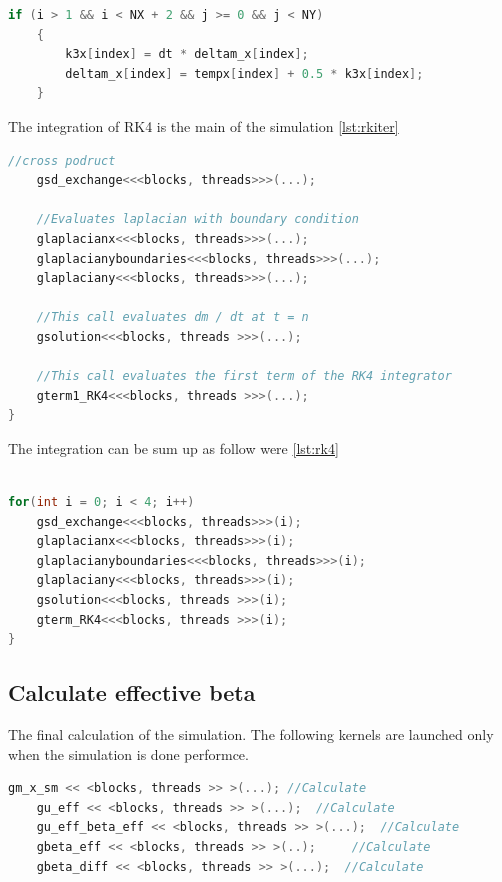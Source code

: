 \begin{lstlisting}[language=C++, label={lst:rkcuda}, caption={CPU Vector Addition}]
    if (i > 1 && i < NX + 2 && j >= 0 && j < NY)
    {
        k3x[index] = dt * deltam_x[index];
        deltam_x[index] = tempx[index] + 0.5 * k3x[index];   
    }
\end{lstlisting}

The integration of RK4 is the main of the simulation \ref{lst:rkiter}

\begin{lstlisting}[language=C++, label={lst:rkiter}, caption={Runge y Kutta integration}]
	//cross podruct
    gsd_exchange<<<blocks, threads>>>(...);

	//Evaluates laplacian with boundary condition
    glaplacianx<<<blocks, threads>>>(...);
    glaplacianyboundaries<<<blocks, threads>>>(...);
    glaplaciany<<<blocks, threads>>>(...);

    //This call evaluates dm / dt at t = n
    gsolution<<<blocks, threads >>>(...);

    //This call evaluates the first term of the RK4 integrator
    gterm1_RK4<<<blocks, threads >>>(...);
}
\end{lstlisting}


The integration can be sum up as follow were
\ref{lst:rk4}
\begin{lstlisting}[language=C++, label={lst:rk4}, caption={Runge y Kutta integration}]	

for(int i = 0; i < 4; i++)
    gsd_exchange<<<blocks, threads>>>(i);
    glaplacianx<<<blocks, threads>>>(i);
    glaplacianyboundaries<<<blocks, threads>>>(i);
    glaplaciany<<<blocks, threads>>>(i);
    gsolution<<<blocks, threads >>>(i);
    gterm_RK4<<<blocks, threads >>>(i);
}
\end{lstlisting}


\subsection{Calculate effective beta}

The final calculation of the simulation. The following kernels are launched only when the simulation is done performce.


\begin{lstlisting}[language=C++, label={lst:rk4}, caption={Runge y Kutta integration}]	
    gm_x_sm << <blocks, threads >> >(...); //Calculate
    gu_eff << <blocks, threads >> >(...);  //Calculate 
    gu_eff_beta_eff << <blocks, threads >> >(...); 	//Calculate
    gbeta_eff << <blocks, threads >> >(..); 	//Calculate
    gbeta_diff << <blocks, threads >> >(...);  //Calculate             
\end{lstlisting}



